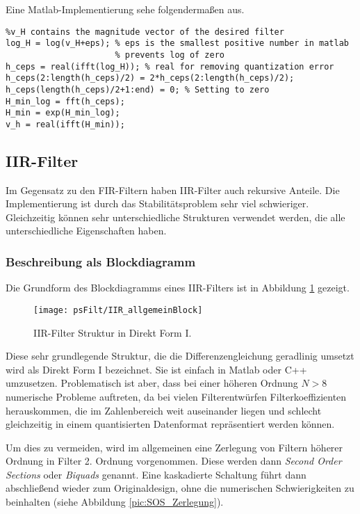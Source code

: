 Eine Matlab-Implementierung sehe folgendermaßen aus.
\begin{verbatim}
%v_H contains the magnitude vector of the desired filter
log_H = log(v_H+eps); % eps is the smallest positive number in matlab
                      % prevents log of zero
h_ceps = real(ifft(log_H)); % real for removing quantization error
h_ceps(2:length(h_ceps)/2) = 2*h_ceps(2:length(h_ceps)/2);
h_ceps(length(h_ceps)/2+1:end) = 0; % Setting to zero
H_min_log = fft(h_ceps);
H_min = exp(H_min_log);
v_h = real(ifft(H_min));
\end{verbatim}


\subsection{IIR-Filter}
Im Gegensatz zu den FIR-Filtern haben IIR-Filter auch rekursive Anteile. Die Implementierung
ist durch das Stabilitätsproblem sehr viel schwieriger. Gleichzeitig können sehr unterschiedliche
Strukturen verwendet werden, die alle unterschiedliche Eigenschaften haben.

\subsubsection{Beschreibung als Blockdiagramm}
Die Grundform des Blockdiagramms eines IIR-Filters ist in Abbildung \ref{pic:IIR_Blockdiagramm} gezeigt.

\begin{figure}[H]
\begin{center}
\texttt{[image: psFilt/IIR\_allgemeinBlock]}
\caption{\label{pic:IIR_Blockdiagramm}IIR-Filter Struktur in Direkt Form I.}
\end{center}
\end{figure}

Diese sehr grundlegende Struktur, die die Differenzengleichung
geradlinig  umsetzt wird als Direkt Form I bezeichnet. Sie ist einfach in Matlab oder C++ umzusetzen.
Problematisch ist aber, dass bei einer höheren Ordnung $N>8$ numerische Probleme auftreten, da bei vielen
Filterentwürfen Filterkoeffizienten herauskommen, die im Zahlenbereich weit auseinander liegen und
schlecht gleichzeitig in einem quantisierten Datenformat repräsentiert werden können.

Um dies zu vermeiden, wird im allgemeinen eine Zerlegung von Filtern höherer Ordnung in Filter 2. Ordnung
vorgenommen. Diese werden dann {\em Second Order Sections} oder {\em Biquads} genannt. Eine kaskadierte
Schaltung führt dann abschließend wieder zum Originaldesign, ohne die numerischen Schwierigkeiten
zu beinhalten (siehe Abbildung \ref{pic:SOS_Zerlegung}).

